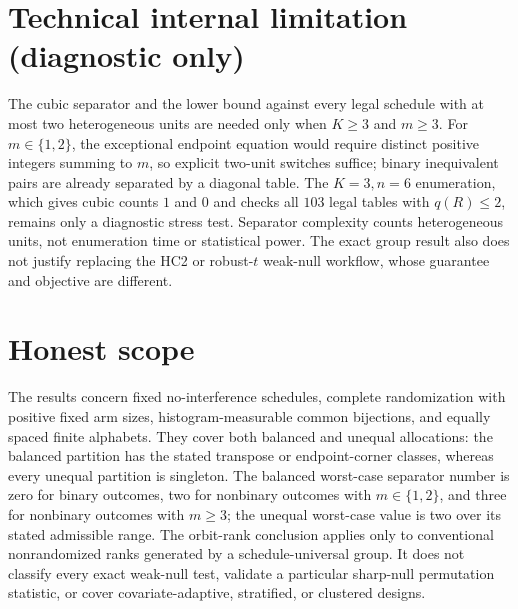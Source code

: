 \documentclass{article}
\begin{document}
\section*{Technical internal limitation (diagnostic only)}

The cubic separator and the lower bound against every legal schedule with at most two heterogeneous units are needed only when \(K\geq3\) and \(m\geq3\). For \(m\in\{1,2\}\), the exceptional endpoint equation would require distinct positive integers summing to \(m\), so explicit two-unit switches suffice; binary inequivalent pairs are already separated by a diagonal table. The \(K=3,n=6\) enumeration, which gives cubic counts \(1\) and \(0\) and checks all \(103\) legal tables with \(q(R)\leq2\), remains only a diagnostic stress test. Separator complexity counts heterogeneous units, not enumeration time or statistical power. The exact group result also does not justify replacing the HC2 or robust-\(t\) weak-null workflow, whose guarantee and objective are different.

\section{Honest scope}

The results concern fixed no-interference schedules, complete randomization with positive fixed arm sizes, histogram-measurable common bijections, and equally spaced finite alphabets. They cover both balanced and unequal allocations: the balanced partition has the stated transpose or endpoint-corner classes, whereas every unequal partition is singleton. The balanced worst-case separator number is zero for binary outcomes, two for nonbinary outcomes with \(m\in\{1,2\}\), and three for nonbinary outcomes with \(m\geq3\); the unequal worst-case value is two over its stated admissible range. The orbit-rank conclusion applies only to conventional nonrandomized ranks generated by a schedule-universal group. It does not classify every exact weak-null test, validate a particular sharp-null permutation statistic, or cover covariate-adaptive, stratified, or clustered designs.
\end{document}

